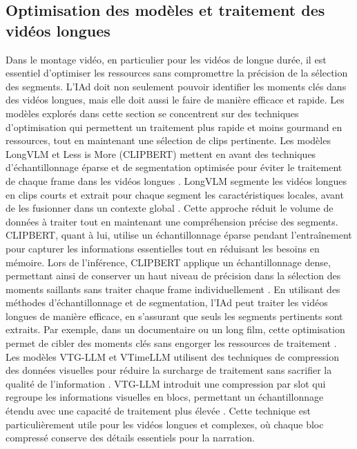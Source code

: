 \documentclass[livre]{udes-genie-these}
\begin{document}
\subsection{Optimisation des modèles et traitement des vidéos longues}
Dans le montage vidéo, en particulier pour les vidéos de longue durée, il est essentiel d'optimiser les ressources sans compromettre la précision de la sélection des segments. L'IAd doit non seulement pouvoir identifier les moments clés dans des vidéos longues, mais elle doit aussi le faire de manière efficace et rapide. Les modèles explorés dans cette section se concentrent sur des techniques d'optimisation qui permettent un traitement plus rapide et moins gourmand en ressources, tout en maintenant une sélection de clips pertinente.
Les modèles LongVLM et Less is More (CLIPBERT) mettent en avant des techniques d'échantillonnage éparse et de segmentation optimisée pour éviter le traitement de chaque frame dans les vidéos longues \cite{weng2024}\cite{lei2021_clipbert}. LongVLM segmente les vidéos longues en clips courts et extrait pour chaque segment les caractéristiques locales, avant de les fusionner dans un contexte global \cite{weng2024}. Cette approche réduit le volume de données à traiter tout en maintenant une compréhension précise des segments.
CLIPBERT, quant à lui, utilise un échantillonnage éparse pendant l'entraînement pour capturer les informations essentielles tout en réduisant les besoins en mémoire. Lors de l'inférence, CLIPBERT applique un échantillonnage dense, permettant ainsi de conserver un haut niveau de précision dans la sélection des moments saillants sans traiter chaque frame individuellement \cite{lei2021_clipbert}.
En utilisant des méthodes d'échantillonnage et de segmentation, l'IAd peut traiter les vidéos longues de manière efficace, en s'assurant que seuls les segments pertinents sont extraits. Par exemple, dans un documentaire ou un long film, cette optimisation permet de cibler des moments clés sans engorger les ressources de traitement \cite{weng2024}\cite{lei2021_clipbert}.
Les modèles VTG-LLM et VTimeLLM utilisent des techniques de compression des données visuelles pour réduire la surcharge de traitement sans sacrifier la qualité de l'information \cite{guo2024_vtgllm}\cite{huang2024_vtimellm}. VTG-LLM introduit une compression par slot qui regroupe les informations visuelles en blocs, permettant un échantillonnage étendu avec une capacité de traitement plus élevée \cite{guo2024_vtgllm}. Cette technique est particulièrement utile pour les vidéos longues et complexes, où chaque bloc compressé conserve des détails essentiels pour la narration.
\end{document}
